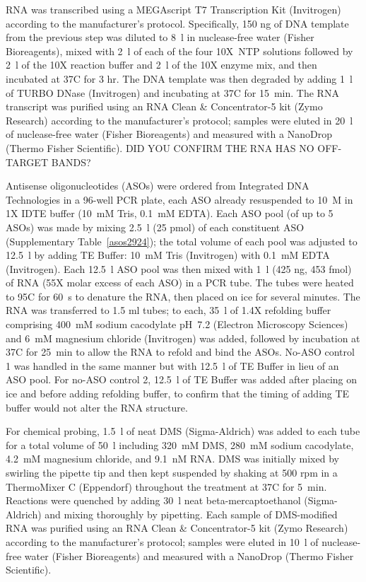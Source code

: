 \documentclass[main.tex]{subfiles}
\begin{document}
RNA was transcribed using a MEGAscript T7 Transcription Kit (Invitrogen) according to the manufacturer's protocol.
Specifically, 150 ng of DNA template from the previous step was diluted to 8~\textmu l in nuclease-free water (Fisher Bioreagents), mixed with 2~\textmu l of each of the four 10X~NTP solutions followed by 2~\textmu l of the 10X reaction buffer and 2~\textmu l of the 10X enzyme mix, and then incubated at 37\textdegree C for 3 hr.
The DNA template was then degraded by adding 1~\textmu l of TURBO DNase (Invitrogen) and incubating at 37\textdegree C for 15~min.
The RNA transcript was purified using an RNA Clean \& Concentrator-5 kit (Zymo Research) according to the manufacturer's protocol; samples were eluted in 20~\textmu l of nuclease-free water (Fisher Bioreagents) and measured with a NanoDrop (Thermo Fisher Scientific).
DID YOU CONFIRM THE RNA HAS NO OFF-TARGET BANDS?

Antisense oligonucleotides (ASOs) were ordered from Integrated DNA Technologies in a 96-well PCR plate, each ASO already resuspended to 10~\textmu M in 1X IDTE buffer (10~mM Tris, 0.1~mM EDTA).
Each ASO pool (of up to 5 ASOs) was made by mixing 2.5~\textmu l (25 pmol) of each constituent ASO (Supplementary Table~\ref{asos2924}); the total volume of each pool was adjusted to 12.5~\textmu l by adding TE Buffer: 10~mM Tris (Invitrogen) with 0.1~mM EDTA (Invitrogen).
Each 12.5~\textmu l ASO pool was then mixed with 1~\textmu l (425 ng, 453 fmol) of RNA (55X molar excess of each ASO) in a PCR tube.
The tubes were heated to 95\textdegree C for 60~s to denature the RNA, then placed on ice for several minutes.
The RNA was transferred to 1.5 ml tubes; to each, 35~\textmu l of 1.4X refolding buffer comprising 400~mM sodium cacodylate pH~7.2 (Electron Microscopy Sciences) and 6~mM magnesium chloride (Invitrogen) was added, followed by incubation at 37\textdegree C for 25~min to allow the RNA to refold and bind the ASOs.
No-ASO control 1 was handled in the same manner but with 12.5~\textmu l of TE Buffer in lieu of an ASO pool.
For no-ASO control 2, 12.5~\textmu l of TE Buffer was added after placing on ice and before adding refolding buffer, to confirm that the timing of adding TE buffer would not alter the RNA structure.

For chemical probing, 1.5~\textmu l of neat DMS (Sigma-Aldrich) was added to each tube for a total volume of 50~\textmu l including 320~mM DMS, 280~mM sodium cacodylate, 4.2~mM magnesium chloride, and 9.1~nM RNA.
DMS was initially mixed by swirling the pipette tip and then kept suspended by shaking at 500 rpm in a ThermoMixer C (Eppendorf) throughout the treatment at 37\textdegree C for 5~min.
Reactions were quenched by adding 30~\textmu l neat beta-mercaptoethanol (Sigma-Aldrich) and mixing thoroughly by pipetting.
Each sample of DMS-modified RNA was purified using an RNA Clean \& Concentrator-5 kit (Zymo Research) according to the manufacturer's protocol; samples were eluted in 10~\textmu l of nuclease-free water (Fisher Bioreagents) and measured with a NanoDrop (Thermo Fisher Scientific).
\end{document}
